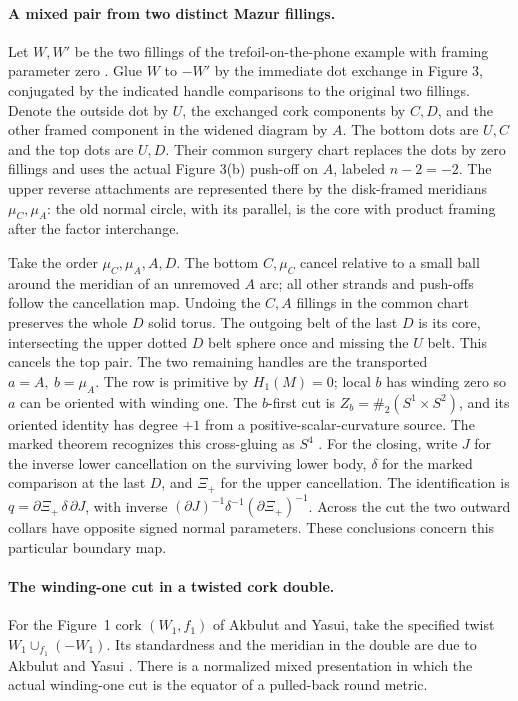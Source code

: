 \paragraph{A mixed pair from two distinct Mazur fillings.}
Let \(W,W'\) be the two fillings of the trefoil-on-the-phone example
with framing parameter zero \cite[Figures 1, 3 and 4]{HaydenMarkPiccirillo2021Mazur}.
Glue \(W\) to \(-W'\) by the immediate dot exchange in Figure 3,
conjugated by the indicated handle comparisons to the original two
fillings. Denote the outside dot by \(U\), the exchanged cork components
by \(C,D\), and the other framed component in the widened diagram by
\(A\). The bottom dots are \(U,C\) and the top dots are \(U,D\).
Their common surgery chart replaces the dots by zero fillings and
uses the actual Figure 3(b) push-off on \(A\), labeled \(n-2=-2\).
The upper reverse
attachments are represented there by the disk-framed meridians
\(\mu_C,\mu_A\): the old normal circle, with its parallel, is the core
with product framing after the factor interchange.

Take the order \(\mu_C,\mu_A,A,D\). The bottom \(C,\mu_C\) cancel
relative to a small ball around the meridian of an unremoved \(A\)
arc; all other strands and push-offs follow the cancellation map.
Undoing the \(C,A\) fillings in the common chart preserves the whole
\(D\) solid torus. The outgoing belt of the last \(D\) is its core,
intersecting the upper dotted \(D\) belt sphere once and missing the
\(U\) belt. This cancels the top pair. The two remaining handles are
the transported \(a=A,\ b=\mu_A\). The row is primitive by
\(H_1(M)=0\); local \(b\) has winding zero so \(a\) can be oriented
with winding one. The \(b\)-first cut is
\(Z_b=\#_2(S^1\times S^2)\), and its oriented identity has degree
\(+1\) from a positive-scalar-curvature source. The marked theorem
recognizes this cross-gluing as \(S^4\) \cite{Baker2026HandleCuts}.
For the closing, write \(J\) for the inverse lower cancellation on
the surviving lower body, \(\delta\) for the marked comparison at
the last \(D\), and \(\Xi_+\) for the upper cancellation. The
identification is \(q=\partial\Xi_+\,\delta\,\partial J\), with inverse
\((\partial J)^{-1}\delta^{-1}(\partial\Xi_+)^{-1}\).
Across the cut the two outward collars have opposite signed normal
parameters. These conclusions concern this particular boundary map.

\paragraph{The winding-one cut in a twisted cork double.}
For the Figure~1 cork \((W_1,f_1)\) of Akbulut and Yasui, take the
specified twist \(W_1\cup_{f_1}(-W_1)\). Its standardness and the
meridian in the double are due to Akbulut and Yasui
\cite[Definitions 2.3, 2.5 and Lemma 2.6]{AkbulutYasui2012Corks}.
There is a normalized mixed presentation in which the actual
winding-one cut is the equator of a pulled-back round metric.


